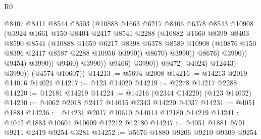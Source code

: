 \begin{lexlean}{R0}
\begin{coremodule}
                                        @8407
                                        @8411
                                        @8544
                                        @8503
                                        (@10888
                                          @1663
                                          @6217
                                          @8406
                                          @6378
                                          @8543
                                          @10908
                                          (@3924
                                            @1661
                                            @150
                                            @8404
                                            @2417
                                            @8541
                                            @2288
                                            (@10882
                                              @1660
                                              @8399
                                              @8403
                                              @8590
                                              @8541
                                              (@10888
                                                @1659
                                                @6217
                                                @8398
                                                @6378
                                                @8589
                                                @10908
                                                (@10876 @150 @8396 @2417 @8587 @2288 @10956 @3990))
                                              @8670)
                                            @3990))
                                        @8676)
                                      @3990))
                                  @9454)
                                @3990))
                            @9460)
                          @3990))
                      @9466)
                    @3990))
                @9472)
              @4024)
            @12443)
          @3990))
      (@4574 @10607))
@14213 := @5694 @2008
@14216 := @14213 @2019 @14016 @14021
@14217 := @123 @14020
@14219 := @2278 @14217 @2288
@14220 := @12181 @14219
@14224 := @14216 (@2344 @14220) (@123 @14032)
@14230 := @4062 @2018 @2417 @14015 @2343 @14220 @4037
@14231 := @4051 @1884
@14236 := @14231 @2017 @10610 @14014 @12180 @14219
@14241 := @4042 @1883 @10604 @10609 @12212 @12180
@14247 := @4051 @1881 @791 @9211 @2419 @9254 @3281
@14252 := @5676 @1880 @9206 @9210 @9309 @9254

\end{coremodule}
\end{lexlean}
